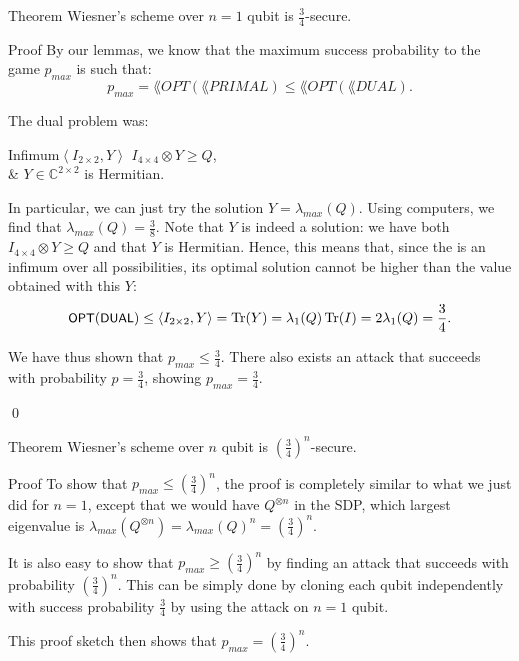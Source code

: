 \documentclass[a4paper]{article}
\begin{document}
\begin{parag}{Theorem}
    Wiesner's scheme over $n = 1$ qubit is $\frac{3}{4}$-secure.

    \begin{subparag}{Proof}
        By our lemmas, we know that the maximum success probability to the  game $p_{max}$ is such that:
        \[p_{max} = \lang{OPT}\left(\lang{PRIMAL}\right) \leq \lang{OPT}\left(\lang{DUAL}\right).\]

        The dual problem was:
        \begin{semidefiniteprogram}{Infimum}{$\left\langle I_{2 \times 2}, Y \right\rangle$}
            $I_{4 \times 4} \otimes Y \geq Q$,\\
            & $Y \in \mathbb{C}^{2 \times 2}$ is Hermitian.
        \end{semidefiniteprogram}

        In particular, we can just try the solution $Y = \lambda_{max}\left(Q\right)$. Using computers, we find that $\lambda_{max}\left(Q\right) = \frac{3}{8}$. Note that $Y$ is indeed a solution: we have both $I_{4 \times 4} \otimes Y \geq Q$ and that $Y$ is Hermitian. Hence, this means that, since the  is an infimum over all possibilities, its optimal solution cannot be higher than the value obtained with this $Y$:
        \[\lang{OPT}\left(\lang{DUAL}\right) \leq \left\langle I_{2 \times 2}, Y \right\rangle = \Tr\left(Y\right) = \lambda_1\left(Q\right) \Tr\left(I\right) = 2 \lambda_1\left(Q\right) = \frac{3}{4}.\]
        
        We have thus shown that $p_{max} \leq \frac{3}{4}$. There also exists an attack that succeeds with probability $p = \frac{3}{4}$, showing $p_{max} = \frac{3}{4}$.

        \qed
    \end{subparag}
\end{parag}

\begin{parag}{Theorem}
    Wiesner's scheme over $n$ qubit is $\left(\frac{3}{4}\right)^n$-secure.

    \begin{subparag}{Proof}
        To show that $p_{max} \leq \left(\frac{3}{4}\right)^n$, the proof is completely similar to what we just did for $n = 1$, except that we would have $Q^{\otimes n}$ in the SDP, which largest eigenvalue is $\lambda_{max}\left(Q^{\otimes n}\right) = \lambda_{max}\left(Q\right)^n = \left(\frac{3}{4}\right)^n$.

        It is also easy to show that $p_{max} \geq \left(\frac{3}{4}\right)^n$ by finding an attack that succeeds with probability $\left(\frac{3}{4}\right)^n$. This can be simply done by cloning each qubit independently with success probability $\frac{3}{4}$ by using the attack on $n = 1$ qubit.

        This proof sketch then shows that $p_{max} = \left(\frac{3}{4}\right)^n$.
    \end{subparag}
\end{parag}
\end{document}
